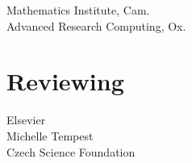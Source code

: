 \documentclass[a4paper]{custom-resume}
\begin{document}
\begin{minipage}[t][0.8\textheight]{0.33\textwidth}
\begin{flushleft}
 Mathematics Institute, Cam. \\ \vspace{4pt}
      Advanced Research Computing, Ox.
\end{flushleft}


\section{Reviewing}

\begin{flushleft}
 Elsevier \\ \vspace{4pt}
 Michelle Tempest \\ \vspace{4pt}
 Czech Science Foundation
\end{flushleft}

\end{minipage}
\hfill
\end{document}
